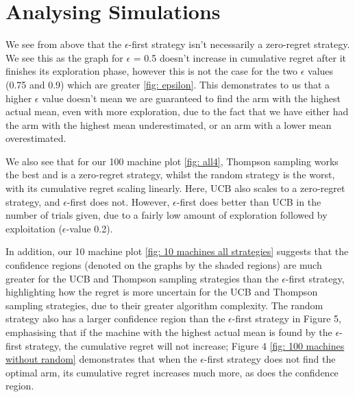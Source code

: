\section{Analysing Simulations}
We see from above that the $\epsilon$-first strategy isn't necessarily a zero-regret strategy. We see this as the graph for $\epsilon$ = 0.5 doesn't increase in cumulative regret after it finishes its exploration phase, however this is not the case for the two $\epsilon$ values (0.75 and 0.9) which are greater \ref{fig: epsilon}. This demonstrates to us that a higher $\epsilon$ value doesn't mean we are guaranteed to find the arm with the highest actual mean, even with more exploration, due to the fact that we have either had the arm with the highest mean underestimated, or an arm with a lower mean overestimated.

We also see that for our 100 machine plot \ref{fig: all4}, Thompson sampling works the best and is a zero-regret strategy, whilst the random strategy is the worst, with its cumulative regret scaling linearly. Here, UCB also scales to a zero-regret strategy, and $\epsilon$-first does not. However, $\epsilon$-first does better than UCB in the number of trials given, due to a fairly low amount of exploration followed by exploitation ($\epsilon$-value 0.2).

In addition, our 10 machine plot \ref{fig: 10 machines all strategies} suggests that the confidence regions (denoted on the graphs by the shaded regions) are much greater for the UCB and Thompson sampling strategies than the $\epsilon$-first strategy, highlighting how the regret is more uncertain for the UCB and Thompson sampling strategies, due to their greater algorithm complexity. The random strategy also has a larger confidence region than the $\epsilon$-first strategy in Figure 5, emphasising that if the machine with the highest actual mean is found by the $\epsilon$-first strategy, the cumulative regret will not increase; Figure 4 \ref{fig: 100 machines without random} demonstrates that when the $\epsilon$-first strategy does not find the optimal arm, its cumulative regret increases much more, as does the confidence region.